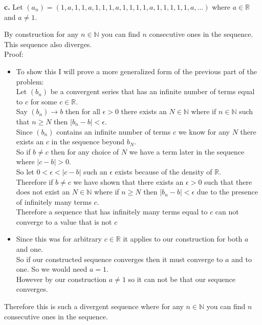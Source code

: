 \documentclass{article}
\begin{document}
{\Large \textbf{c.}} Let $(a_n) = (1, a, 1, 1, a, 1, 1, 1, a, 1, 1, 1, 1, a, 1, 1, 1, 1, 1, a, ...)$ where $a\in\mathbb{R}$ and $a\neq 1$.
\begin{center}
    \doublespacing
    By construction for any $n\in\mathbb{N}$ you can find $n$ consecutive ones in the sequence. This sequence also diverges.
    \\Proof:
    \begin{itemize}
        \item To show this I will prove a more generalized form of the previous part of the problem:
        \\Let $(b_n)$ be a convergent series that has an infinite number of terms equal to $c$ for some $c\in\mathbb{R}$.
        \\Say $(b_n)\rightarrow b$ then for all $\epsilon > 0$ there exists an $N\in\mathbb{N}$ where if $n\in\mathbb{N}$ such that $n\geq N$ then $|b_n - b| <\epsilon$.
        \\Since $(b_n)$ contains an infinite number of terms $c$ we know for any $N$ there exists an $c$ in the sequence beyond $b_N$.
        \\So if $b\neq c$ then for any choice of $N$ we have a term later in the sequence where $|c - b| > 0$.
        \\So let $0 <\epsilon < |c - b|$ such an $\epsilon$ exists because of the density of $\mathbb{R}$.
        \\Therefore if $b\neq c$ we have shown that there exists an $\epsilon > 0$ such that there does not exist an $N\in\mathbb{N}$ where if $n\geq N$ then $|b_n - b| <\epsilon$ due to the presence of infinitely many terms $c$.
        \\Therefore a sequence that has infinitely many terms equal to $c$ can not converge to a value that is not $c$ \qedsymbol
        \item Since this was for arbitrary $c\in\mathbb{R}$ it applies to our construction for both $a$ and one.
        \\So if our constructed sequence converges then it must converge to $a$ and to one. So we would need $a = 1$.
        \\However by our construction $a\neq 1$ so it can not be that our sequence converges.
    \end{itemize}
    Therefore this is such a divergent sequence where for any $n\in\mathbb{N}$ you can find $n$ consecutive ones in the sequence.
\end{center}
\end{document}
